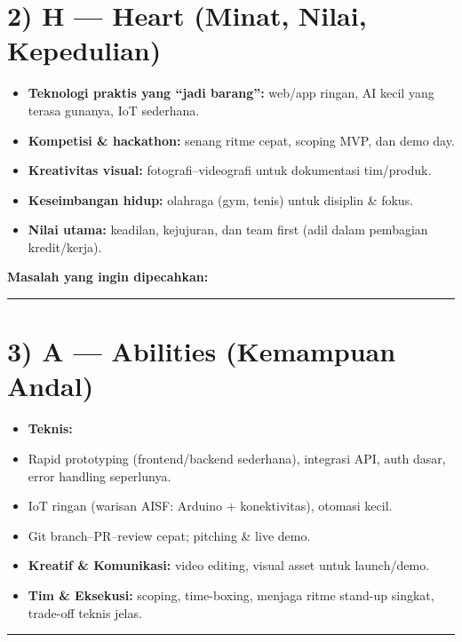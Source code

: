 \documentclass[
  letterpaper,
  DIV=11,
  numbers=noendperiod]{scrreprt}
\begin{document}
\section{2) H --- Heart (Minat, Nilai,
Kepedulian)}\label{h-heart-minat-nilai-kepedulian}

\begin{itemize}
\item
  \textbf{Teknologi praktis yang ``jadi barang'':} web/app ringan, AI
  kecil yang terasa gunanya, IoT sederhana.
\item
  \textbf{Kompetisi \& hackathon:} senang ritme cepat, scoping MVP, dan
  demo day.
\item
  \textbf{Kreativitas visual:} fotografi--videografi untuk dokumentasi
  tim/produk.
\item
  \textbf{Keseimbangan hidup:} olahraga (gym, tenis) untuk disiplin \&
  fokus.
\item
  \textbf{Nilai utama:} keadilan, kejujuran, dan team first (adil dalam
  pembagian kredit/kerja).
\end{itemize}

\textbf{Masalah yang ingin dipecahkan:}

\begin{center}\rule{0.5\linewidth}{0.5pt}\end{center}

\section{3) A --- Abilities (Kemampuan
Andal)}\label{a-abilities-kemampuan-andal}

\begin{itemize}
\item
  \textbf{Teknis:}
\item
  Rapid prototyping (frontend/backend sederhana), integrasi API, auth
  dasar, error handling seperlunya.
\item
  IoT ringan (warisan AISF: Arduino + konektivitas), otomasi kecil.
\item
  Git branch--PR--review cepat; pitching \& live demo.
\item
  \textbf{Kreatif \& Komunikasi:} video editing, visual asset untuk
  launch/demo.
\item
  \textbf{Tim \& Eksekusi:} scoping, time-boxing, menjaga ritme stand-up
  singkat, trade-off teknis jelas.
\end{itemize}

\begin{center}\rule{0.5\linewidth}{0.5pt}\end{center}
\end{document}

